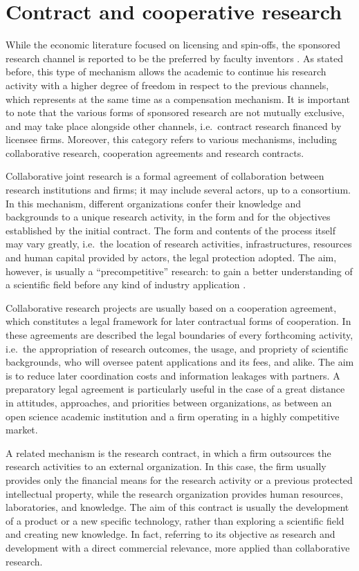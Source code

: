\section{Contract and cooperative research}

While the economic literature focused on licensing and spin-offs, the sponsored research channel is reported to be the preferred by faculty inventors \citep{Jensen1998}. As stated before, this type of mechanism allows the academic to continue his research activity with a higher degree of freedom in respect to the previous channels, which represents at the same time as a compensation mechanism. It is important to note that the various forms of sponsored research are not mutually exclusive, and may take place alongside other channels, i.e.\ contract research financed by licensee firms. Moreover, this category refers to various mechanisms, including collaborative research, cooperation agreements and research contracts.

Collaborative joint research is a formal agreement of collaboration between research institutions and firms; it may include several actors, up to a consortium. In this mechanism, different organizations confer their knowledge and backgrounds to a unique research activity, in the form and for the objectives established by the initial contract. The form and contents of the process itself may vary greatly, i.e.\ the location of research activities, infrastructures, resources and human capital provided by actors, the legal protection adopted. The aim, however, is usually a \enquote{precompetitive} research: to gain a better understanding of a scientific field before any kind of industry application \citep{DEste2011}.

Collaborative research projects are usually based on a cooperation agreement, which constitutes a legal framework for later contractual forms of cooperation. In these agreements are described the legal boundaries of every forthcoming activity, i.e.\ the appropriation of research outcomes, the usage, and propriety of scientific backgrounds, who will oversee patent applications and its fees, and alike. The aim is to reduce later coordination costs and information leakages with partners. A preparatory legal agreement is particularly useful in the case of a great distance in attitudes, approaches, and priorities between organizations, as between an open science academic institution and a firm operating in a highly competitive market. 

A related mechanism is the research contract, in which a firm outsources the research activities to an external organization. In this case, the firm usually provides only the financial means for the research activity or a previous protected intellectual property, while the research organization provides human resources, laboratories, and knowledge. The aim of this contract is usually the development of a product or a new specific technology, rather than exploring a scientific field and creating new knowledge. In fact, \citet{DEste2011} referring to its objective as research and development with a direct commercial relevance, more applied than collaborative research.

